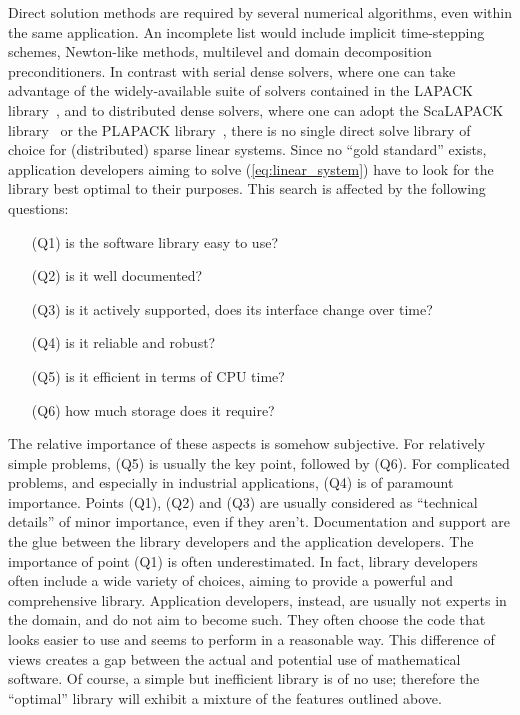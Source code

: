 \documentclass[acmtocl]{acmtrans2m}
\begin{document}
\smallskip

Direct solution methods are required by several numerical algorithms, even
within the same application. An
incomplete list would include implicit time-stepping schemes, 
Newton-like methods, multilevel and domain decomposition preconditioners. 
In contrast with serial dense solvers, where one can take advantage of the
widely-available suite of solvers contained in the LAPACK
library~\cite{lapack-guide}, and to distributed dense solvers, where one can
adopt the ScaLAPACK library~\cite{scalapack-guide} or the PLAPACK
library~\cite{alpatov97plapack}, there is no single direct solve library of
choice for (distributed) sparse linear systems.  Since no ``gold
standard'' exists, application developers aiming to solve
(\ref{eq:linear_system}) have to look
for the library best optimal to their purposes. This search is affected by the following questions:
\begin{enumerate}
\item[(Q1)] is the software library easy to use?
\item[(Q2)] is it well documented?
\item[(Q3)] is it actively supported, does its interface change over time?
\item[(Q4)] is it reliable and robust?
\item[(Q5)] is it efficient in terms of CPU time?
\item[(Q6)] how much storage does it require?
\end{enumerate}
The relative importance of these aspects is somehow subjective. For relatively
simple problems, (Q5) is usually the key point, followed by (Q6). For
complicated problems, and especially in industrial applications, (Q4) is of
paramount importance. Points (Q1), (Q2) and (Q3) are usually considered as
``technical details'' of minor importance, even if they aren't. Documentation
and support are the glue between the library developers and the application
developers. The importance of point (Q1)
is often underestimated.  In fact, library developers often include a wide variety
of choices, aiming to provide a powerful and comprehensive library.
Application developers, instead, are usually not experts in the domain, and do
not aim to become such. They often choose the code that looks easier to use and
seems to perform in a reasonable way. This difference of views creates a gap between
the actual and potential use of mathematical software.
Of course, a simple but inefficient library is of no use; therefore the
``optimal'' library will exhibit a mixture of the features outlined above.
\end{document}
